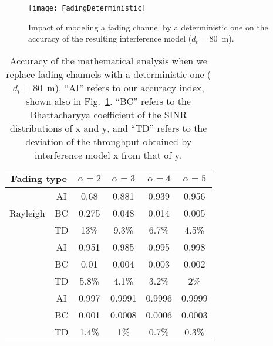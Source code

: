 \documentclass[12pt, draftclsnofoot, onecolumn]{IEEEtran}
\begin{document}
\begin{figure}[!t]
  \centering
  \texttt{[image: FadingDeterministic]}

  \caption{Impact of modeling a fading channel by a deterministic one on the accuracy of the resulting interference model ($d_t = 80$~m).}
  \label{fig: FadingDeterministic}
\vspace{-5mm}
\end{figure}
\begin{table}[!t]
  \centering
  \caption{Accuracy of the mathematical analysis when we replace fading channels with a deterministic one ($d_t = 80$~m). ``AI'' refers to our accuracy index, shown also in Fig.~\ref{fig: FadingDeterministic}. ``BC'' refers to the Bhattacharyya coefficient of the SINR distributions of $\mathrm{x}$ and $\mathrm{y}$, and ``TD'' refers to the deviation of the throughput obtained by interference model $\mathrm{x}$ from that of $\mathrm{y}$.}
  \label{table: FadingDeterministic}
{
\renewcommand{\tabcolsep}{5pt}
\renewcommand{\arraystretch}{0.85}
\begin{tabular}{|c|c|c|c|c|c|}
\hline
\multicolumn{2}{|c|}{Fading type} & $\alpha=2$ & $\alpha=3$ & $\alpha=4$ & $\alpha=5$  \\ \hline
\multirow{3}{*}{Rayleigh}  & AI & 0.68 & 0.881 & 0.939 & 0.956 \\ \cline{2-6}
& BC & 0.275 & 0.048 & 0.014 & 0.005 \\ \cline{2-6}
 & TD & 13\% & 9.3\% & 6.7\% & 4.5\%  \\ \Xhline{2\arrayrulewidth}
\multirow{3}{*}{Nakagami ($m=3$)}   & AI & 0.951 & 0.985 & 0.995 & 0.998 \\ \cline{2-6}
& BC & 0.01 & 0.004 & 0.003 & 0.002 \\ \cline{2-6}
 & TD & 5.8\% & 4.1\% & 3.2\% & 2\%  \\ \Xhline{2\arrayrulewidth}
\multirow{3}{*}{Nakagami ($m=9$)}   & AI & 0.997 & 0.9991 & 0.9996 & 0.9999 \\ \cline{2-6}
& BC & 0.001 & 0.0008 & 0.0006 & 0.0003 \\ \cline{2-6}
 & TD & 1.4\% & 1\% & 0.7\% & 0.3\% \\ \hline
\end{tabular}
}
\vspace{-7mm}
\end{table}
\end{document}
